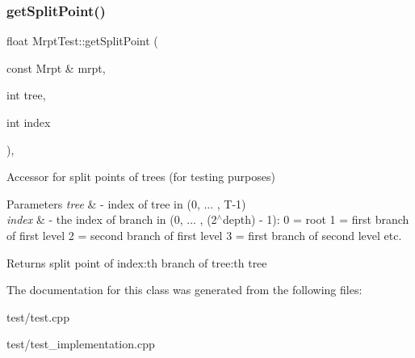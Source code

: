 \subsubsection{\texorpdfstring{get\+Split\+Point()}{getSplitPoint()}\hspace{0.1cm}{\footnotesize\ttfamily [2/2]}}
{\footnotesize\ttfamily float Mrpt\+Test\+::get\+Split\+Point (\begin{DoxyParamCaption}\item[{const Mrpt \&}]{mrpt,  }\item[{int}]{tree,  }\item[{int}]{index }\end{DoxyParamCaption})\hspace{0.3cm}{\ttfamily [inline]}, {\ttfamily [protected]}}

Accessor for split points of trees (for testing purposes) 
\begin{DoxyParams}{Parameters}
{\em tree} & -\/ index of tree in (0, ... , T-\/1) \\
\hline
{\em index} & -\/ the index of branch in (0, ... , (2$^\wedge$depth) -\/ 1)\+: 0 = root 1 = first branch of first level 2 = second branch of first level 3 = first branch of second level etc. \\
\hline
\end{DoxyParams}
\begin{DoxyReturn}{Returns}
split point of index\+:th branch of tree\+:th tree 
\end{DoxyReturn}


The documentation for this class was generated from the following files\+:\begin{DoxyCompactItemize}
\item 
test/test.\+cpp\item 
test/test\+\_\+implementation.\+cpp\end{DoxyCompactItemize}

